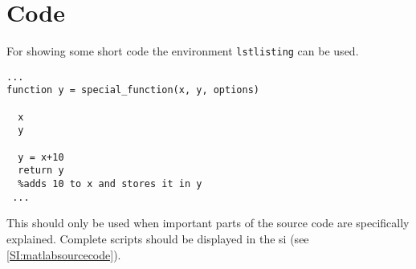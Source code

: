 \chapter{Code}
For showing some short code the environment \verb+lstlisting+ can be used.
\begin{lstlisting}[firstnumber=1550]
...
function y = special_function(x, y, options)

  x
  y
  
  y = x+10
  return y
  %adds 10 to x and stores it in y
 ...
\end{lstlisting}
\noindent
This should only be used when important parts of the source code are specifically explained. Complete scripts should be displayed in the \gls{si} (see \ref{SI:matlabsourcecode}).
